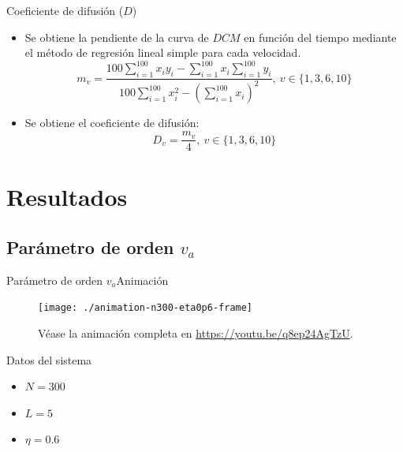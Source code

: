 \documentclass{beamer}
\begin{document}
            \begin{frame}{Coeficiente de difusión ($D$)}
                \begin{itemize}
                    \item Se obtiene la pendiente de la curva de $DCM$ en función del tiempo mediante el método
                    de regresión lineal simple para cada velocidad.
                    \begin{equation*}
                        m_v = \frac{100 \sum_{i=1}^{100} x_i y_i - \sum_{i=1}^{100} x_i \sum_{i=1}^{100} y_i }{100 \sum_{i=1}^{100} x_i^2
                        - \left(\sum_{i=1}^{100} x_i \right)^2},\ v \in \{1, 3, 6, 10\}
                    \end{equation*}
                    \item Se obtiene el coeficiente de difusión:
                    \begin{equation*}
                        D_v = \frac{m_v}{4},\ v \in \{1, 3, 6, 10\}
                    \end{equation*}
                \end{itemize}
            \end{frame}


    \section{Resultados}

        \subsection{Parámetro de orden $v_a$}

            \begin{frame}{Parámetro de orden $v_a$}{Animación}
                \begin{minipage}[t]{0.60\textwidth}
                    \begin{figure}[H!]
                        \texttt{[image: ./animation-n300-eta0p6-frame]}
                        \caption*{Véase la animación completa en \url{https://youtu.be/q8ep24AgTzU}.}
                        \label{fig:va_1}
                    \end{figure}
                \end{minipage}
                \hfill
                \begin{minipage}[t]{0.30\textwidth}
                    \begin{block}{Datos del sistema}
                        \begin{itemize}
                            \item $N=300$
                            \item $L=5$
                            \item $\eta=0.6$
                        \end{itemize}
                    \end{block}
                \end{minipage}
            \end{frame}
\end{document}
